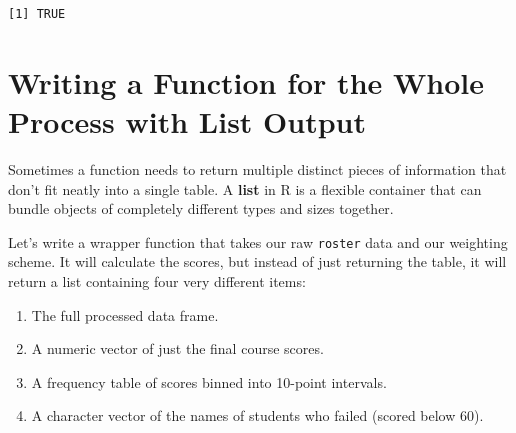 \documentclass[
  letterpaper,
  DIV=11,
  numbers=noendperiod]{scrreprt}
\providecommand{\tightlist}{%
  \setlength{\itemsep}{0pt}\setlength{\parskip}{0pt}}
\begin{document}
\begin{verbatim}
[1] TRUE
\end{verbatim}

\section{Writing a Function for the Whole Process with List
Output}\label{writing-a-function-for-the-whole-process-with-list-output}

Sometimes a function needs to return multiple distinct pieces of
information that don't fit neatly into a single table. A \textbf{list}
in R is a flexible container that can bundle objects of completely
different types and sizes together.

Let's write a wrapper function that takes our raw \texttt{roster} data
and our weighting scheme. It will calculate the scores, but instead of
just returning the table, it will return a list containing four very
different items:

\begin{enumerate}
\def\labelenumi{\arabic{enumi}.}
\tightlist
\item
  The full processed data frame.
\item
  A numeric vector of just the final course scores.
\item
  A frequency table of scores binned into 10-point intervals.
\item
  A character vector of the names of students who failed (scored below
  60).
\end{enumerate}
\end{document}
